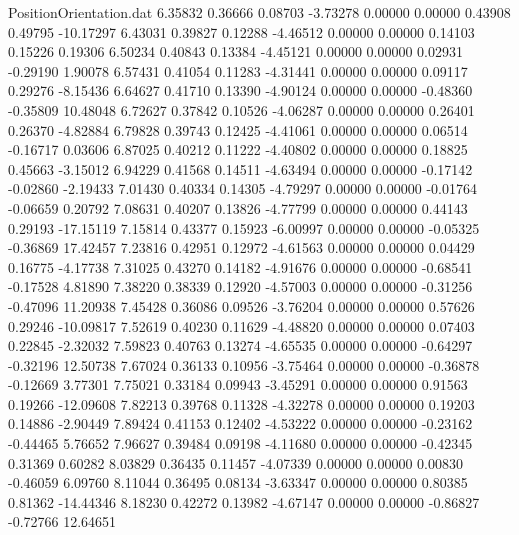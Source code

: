 \begin{filecontents}{PositionOrientation.dat}
   6.35832    0.36666    0.08703    -3.73278    0.00000    0.00000    0.43908    0.49795  -10.17297
   6.43031    0.39827    0.12288    -4.46512    0.00000    0.00000    0.14103    0.15226    0.19306
   6.50234    0.40843    0.13384    -4.45121    0.00000    0.00000    0.02931   -0.29190    1.90078
   6.57431    0.41054    0.11283    -4.31441    0.00000    0.00000    0.09117    0.29276   -8.15436
   6.64627    0.41710    0.13390    -4.90124    0.00000    0.00000   -0.48360   -0.35809   10.48048
   6.72627    0.37842    0.10526    -4.06287    0.00000    0.00000    0.26401    0.26370   -4.82884
   6.79828    0.39743    0.12425    -4.41061    0.00000    0.00000    0.06514   -0.16717    0.03606
   6.87025    0.40212    0.11222    -4.40802    0.00000    0.00000    0.18825    0.45663   -3.15012
   6.94229    0.41568    0.14511    -4.63494    0.00000    0.00000   -0.17142   -0.02860   -2.19433
   7.01430    0.40334    0.14305    -4.79297    0.00000    0.00000   -0.01764   -0.06659    0.20792
   7.08631    0.40207    0.13826    -4.77799    0.00000    0.00000    0.44143    0.29193  -17.15119
   7.15814    0.43377    0.15923    -6.00997    0.00000    0.00000   -0.05325   -0.36869   17.42457
   7.23816    0.42951    0.12972    -4.61563    0.00000    0.00000    0.04429    0.16775   -4.17738
   7.31025    0.43270    0.14182    -4.91676    0.00000    0.00000   -0.68541   -0.17528    4.81890
   7.38220    0.38339    0.12920    -4.57003    0.00000    0.00000   -0.31256   -0.47096   11.20938
   7.45428    0.36086    0.09526    -3.76204    0.00000    0.00000    0.57626    0.29246  -10.09817
   7.52619    0.40230    0.11629    -4.48820    0.00000    0.00000    0.07403    0.22845   -2.32032
   7.59823    0.40763    0.13274    -4.65535    0.00000    0.00000   -0.64297   -0.32196   12.50738
   7.67024    0.36133    0.10956    -3.75464    0.00000    0.00000   -0.36878   -0.12669    3.77301
   7.75021    0.33184    0.09943    -3.45291    0.00000    0.00000    0.91563    0.19266  -12.09608
   7.82213    0.39768    0.11328    -4.32278    0.00000    0.00000    0.19203    0.14886   -2.90449
   7.89424    0.41153    0.12402    -4.53222    0.00000    0.00000   -0.23162   -0.44465    5.76652
   7.96627    0.39484    0.09198    -4.11680    0.00000    0.00000   -0.42345    0.31369    0.60282
   8.03829    0.36435    0.11457    -4.07339    0.00000    0.00000    0.00830   -0.46059    6.09760
   8.11044    0.36495    0.08134    -3.63347    0.00000    0.00000    0.80385    0.81362  -14.44346
   8.18230    0.42272    0.13982    -4.67147    0.00000    0.00000   -0.86827   -0.72766   12.64651

\end{filecontents}
